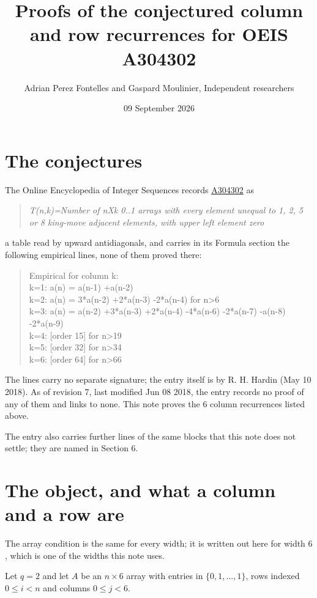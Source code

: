 \documentclass[11pt]{article}
\title{Proofs of the conjectured column and row recurrences for OEIS A304302}
\author{Adrian Perez Fontelles and Gaspard Moulinier, Independent researchers}
\date{09 September 2026}
\theoremstyle{definition}
\begin{document}
\maketitle
\section{The conjectures}

The Online Encyclopedia of Integer Sequences records \href{https://oeis.org/A304302}{A304302} as

\begin{quote}\itshape T(n,k)=Number of nXk 0..1 arrays with every element unequal to 1, 2, 5 or 8 king-move adjacent elements, with upper left element zero\end{quote}

a table read by upward antidiagonals, and carries in its Formula section the following empirical lines, none of them proved there:

\begin{quote}\ttfamily Empirical for column k:\\
k=1: a(n) = a(n-1) +a(n-2)\\k=2: a(n) = 3*a(n-2) +2*a(n-3) -2*a(n-4) for n>6\\k=3: a(n) = a(n-2) +3*a(n-3) +2*a(n-4) -4*a(n-6) -2*a(n-7) -a(n-8) -2*a(n-9)\\k=4: [order 15] for n>19\\k=5: [order 32] for n>34\\k=6: [order 64] for n>66\end{quote}

The lines carry no separate signature; the entry itself is by R. H. Hardin (May 10 2018). As of revision 7, last modified Jun 08 2018, the entry records no proof of any of them and links to none. This note proves the 6 column recurrences listed above.

The entry also carries further lines of the same blocks that this note does not settle; they are named in Section 6.

\section{The object, and what a column and a row are}

The array condition is the same for every width; it is written out here for width $6$, which is one of the widths this note uses.

Let $q = 2$ and let $A$ be an $n \times 6$ array with entries in $\{0,1,\dots,1\}$, rows indexed $0 \le i < n$ and columns $0 \le j < 6$.
\end{document}
